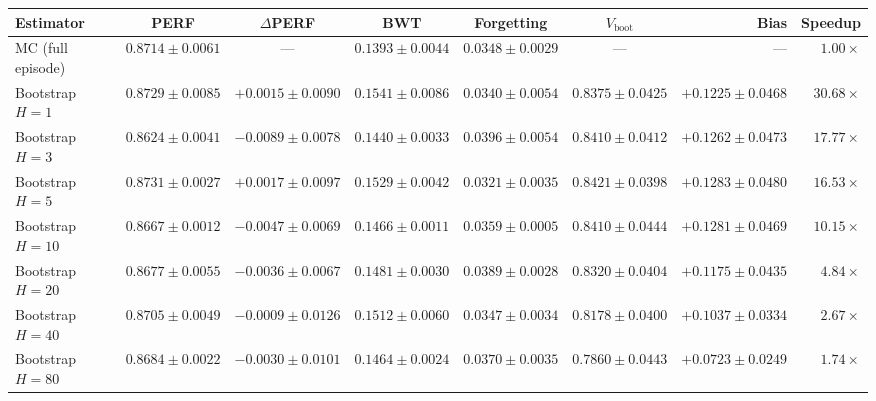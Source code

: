\begin{tabular}{lcccccrr}
\toprule
Estimator & PERF & $\Delta$PERF & BWT & Forgetting & $V_{\mathrm{boot}}$ & Bias & Speedup \\
\midrule
MC (full episode) & $0.8714\pm0.0061$ & --- & $0.1393\pm0.0044$ & $0.0348\pm0.0029$ & --- & --- & $1.00\times$ \\
Bootstrap $H=1$ & $0.8729\pm0.0085$ & $+0.0015\pm0.0090$ & $0.1541\pm0.0086$ & $0.0340\pm0.0054$ & $0.8375\pm0.0425$ & $+0.1225\pm0.0468$ & $30.68\times$ \\
Bootstrap $H=3$ & $0.8624\pm0.0041$ & $-0.0089\pm0.0078$ & $0.1440\pm0.0033$ & $0.0396\pm0.0054$ & $0.8410\pm0.0412$ & $+0.1262\pm0.0473$ & $17.77\times$ \\
Bootstrap $H=5$ & $0.8731\pm0.0027$ & $+0.0017\pm0.0097$ & $0.1529\pm0.0042$ & $0.0321\pm0.0035$ & $0.8421\pm0.0398$ & $+0.1283\pm0.0480$ & $16.53\times$ \\
Bootstrap $H=10$ & $0.8667\pm0.0012$ & $-0.0047\pm0.0069$ & $0.1466\pm0.0011$ & $0.0359\pm0.0005$ & $0.8410\pm0.0444$ & $+0.1281\pm0.0469$ & $10.15\times$ \\
Bootstrap $H=20$ & $0.8677\pm0.0055$ & $-0.0036\pm0.0067$ & $0.1481\pm0.0030$ & $0.0389\pm0.0028$ & $0.8320\pm0.0404$ & $+0.1175\pm0.0435$ & $4.84\times$ \\
Bootstrap $H=40$ & $0.8705\pm0.0049$ & $-0.0009\pm0.0126$ & $0.1512\pm0.0060$ & $0.0347\pm0.0034$ & $0.8178\pm0.0400$ & $+0.1037\pm0.0334$ & $2.67\times$ \\
Bootstrap $H=80$ & $0.8684\pm0.0022$ & $-0.0030\pm0.0101$ & $0.1464\pm0.0024$ & $0.0370\pm0.0035$ & $0.7860\pm0.0443$ & $+0.0723\pm0.0249$ & $1.74\times$ \\
\bottomrule
\end{tabular}
